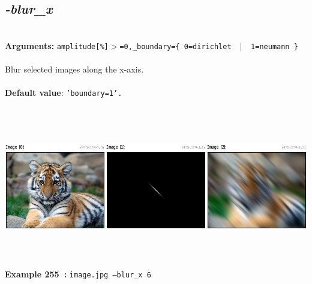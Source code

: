 \documentclass[a4paper,11pt,twoside]{book}
\begin{document}
\subsection{\emph{-blur\_x} }\vspace*{-0.5em}
~\\\textbf{Arguments: } 
{\small \texttt{amplitude[\%]$>$=0,\_boundary=\{ 0=dirichlet ~$|$~ 1=neumann \}}}\\~\\
Blur selected images along the x-axis.
~\\~\\\textbf{Default value}: {\small \texttt{'boundary=1'.}}
\begin{center}\includegraphics[keepaspectratio=true,height=7cm,width=\textwidth]{img/gmic_def255.jpg}\\
{\footnotesize \textbf{Example 255~:} \texttt{image.jpg --blur\_x 6}}
\end{center}
\end{document}

